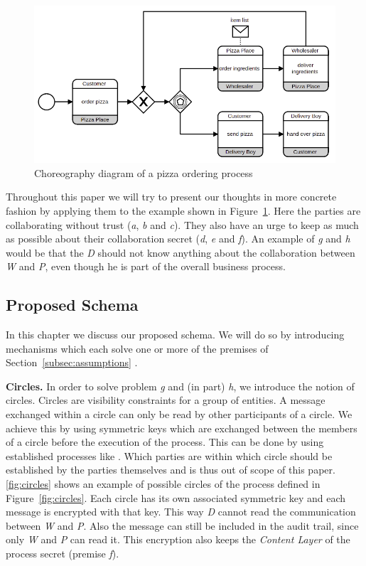 \documentclass[runningheads]{llncs}
\newcommand{\ber}[1]{\textit{#1}}
\newcommand{\reffig}[1]{Figure~\ref{#1}}
\newcommand{\refsec}[1]{Section~\ref{#1}}
\begin{document}
\begin{figure}[h!]
    \centering
    \includegraphics[scale=0.6]{bpmn.png}
    \caption{Choreography diagram of a pizza ordering process} 
    \label{fig:simple_bpmn}
\end{figure}


Throughout this paper we will try to present our thoughts in more concrete fashion by applying them to the example shown in \reffig{fig:simple_bpmn}. Here the parties are collaborating without trust (\ber{a}, \ber{b} and \ber{c}). They also have an urge to keep as much as possible about their collaboration secret (\ber{d}, \ber{e} and \ber{f}). An example of \ber{g} and \ber{h} would be that the \textit{D} 
 should not know anything about the collaboration between \textit{W} and \textit{P}, even though he is part of the overall business process. 



\subsection{Proposed Schema} \label{subsec:schema}

In this chapter we discuss our proposed schema. We will do so by introducing mechanisms which each solve one or more of the premises of \refsec{subsec:assumptions} .

\bigbreak
\textbf{Circles.} In order to solve problem \ber{g} and (in part) \ber{h}, we introduce the notion of circles. Circles are visibility constraints for a group of entities. A message exchanged within a circle can only be read by other participants of a circle. We achieve this by using symmetric keys which are exchanged between the members of a circle before the execution of the process. This can be done by using established processes like . Which parties are within which circle should be established by the parties themselves and is thus out of scope of this paper. \ref{fig:circles} shows an example of possible circles of the process defined in  \reffig{fig:circles}. Each circle has its own associated symmetric key and each message is encrypted with that key. This way \ber{D} cannot read the communication between \ber{W} and \ber{P}. Also the message can still be included in the audit trail, since only \ber{W} and \ber{P} can read it. This encryption also keeps the \ber{Content Layer} of the process secret (premise \ber{f}).
\end{document}
